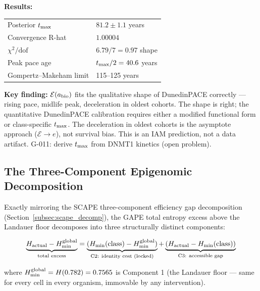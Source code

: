 \documentclass[12pt,a4paper]{article}
\begin{document}
\textbf{Results:}
\begin{center}
\renewcommand{\arraystretch}{1.2}
\begin{tabular}{ll}
\toprule
Posterior $t_{\rm max}$ & $81.2 \pm 1.1$ years \\
Convergence R-hat & $1.00004$ \\
$\chi^2/\text{dof}$ & $6.79/7 = 0.97$ shape \\
Peak pace age & $t_{\rm max}/2 = 40.6$ years \\
Gompertz--Makeham limit & 115--125 years \\
\bottomrule
\end{tabular}
\end{center}

\noindent \textbf{Key finding:} $\mathcal{E}(a_{\rm bio})$ fits the qualitative shape
of DunedinPACE correctly --- rising pace, midlife peak, deceleration in oldest cohorts.
The shape is right; the quantitative DunedinPACE calibration requires either a
modified functional form or class-specific $t_{\rm max}$.
The deceleration in oldest cohorts is the asymptote approach ($\mathcal{E} \to e$),
not survival bias. This is an IAM prediction, not a data artifact.
G-011: derive $t_{\rm max}$ from DNMT1 kinetics (open problem).

\subsection{The Three-Component Epigenomic Decomposition}
\label{subsec:three_comp}

Exactly mirroring the SCAPE three-component efficiency gap decomposition
(Section~\ref{subsec:scape_decomp}), the GAPE total entropy excess above
the Landauer floor decomposes into three structurally distinct components:

\begin{equation}
\underbrace{H_{\rm actual} - H_{\rm min}^{\rm global}}_{\text{total excess}}
=
\underbrace{(H_{\rm min}(\text{class}) - H_{\rm min}^{\rm global})}_{\text{C2: identity cost (locked)}}
+
\underbrace{(H_{\rm actual} - H_{\rm min}(\text{class}))}_{\text{C3: accessible gap}}
\end{equation}

\noindent where $H_{\rm min}^{\rm global} = H(0.782) = 0.7565$ is Component 1
(the Landauer floor --- same for every cell in every organism, immovable by any intervention).
\end{document}
